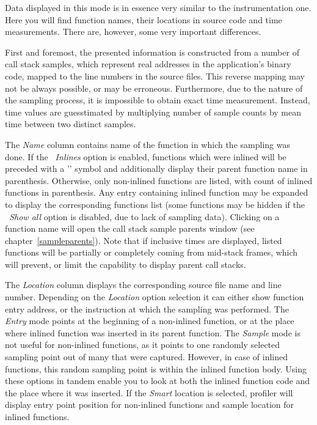 \documentclass[hidelinks,titlepage,a4paper]{article}
\begin{document}
Data displayed in this mode is in essence very similar to the instrumentation one. Here you will find function names, their locations in source code and time measurements. There are, however, some very important differences.

First and foremost, the presented information is constructed from a number of call stack samples, which represent real addresses in the application's binary code, mapped to the line numbers in the source files. This reverse mapping may not be always possible, or may be erroneous. Furthermore, due to the nature of the sampling process, it is impossible to obtain exact time measurement. Instead, time values are guesstimated by multiplying number of sample counts by mean time between two distinct samples.

The \emph{Name} column contains name of the function in which the sampling was done. If the \emph{\faSitemap{}~Inlines} option is enabled, functions which were inlined will be preceded with a '\faCaretRight{}' symbol and additionally display their parent function name in parenthesis. Otherwise, only non-inlined functions are listed, with count of inlined functions in parenthesis. Any entry containing inlined function may be expanded to display the corresponding functions list (some functions may be hidden if the \emph{\faPuzzlePiece{}~Show all} option is disabled, due to lack of sampling data). Clicking on a function name will open the call stack sample parents window (see chapter~\ref{sampleparents}). Note that if inclusive times are displayed, listed functions will be partially or completely coming from mid-stack frames, which will prevent, or limit the capability to display parent call stacks.

The \emph{Location} column displays the corresponding source file name and line number. Depending on the \emph{Location} option selection it can either show function entry address, or the instruction at which the sampling was performed. The \emph{Entry} mode points at the beginning of a non-inlined function, or at the place where inlined function was inserted in its parent function. The \emph{Sample} mode is not useful for non-inlined functions, as it points to one randomly selected sampling point out of many that were captured. However, in case of inlined functions, this random sampling point is within the inlined function body. Using these options in tandem enable you to look at both the inlined function code and the place where it was inserted. If the \emph{Smart} location is selected, profiler will display entry point position for non-inlined functions and sample location for inlined functions.
\end{document}
